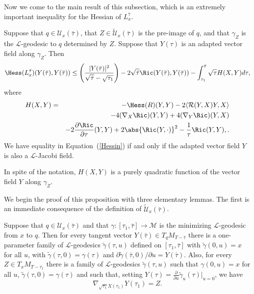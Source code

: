 Now we come to the main result of this subsection, which is an
extremely important inequality for the Hessian of $L_x^{\bar\tau}$.

\begin{proposition}\label{prop:l-length-hessian-inequality}
\label{Hessineq}
Suppose that $q\in {\mathcal U}_x(\bar\tau)$, that $Z\in
\widetilde{\mathcal U}_x(\bar\tau)$ is the pre-image of $q$,  and
that $\gamma_Z$ is the  ${\mathcal L}$-geodesic to $q$ determined by
$Z$. Suppose  that $Y(\tau)$ is an adapted vector field along
$\gamma_Z$. Then
\begin{equation}\label{Hessin}
\Hess(L_x^{\bar\tau})(Y(\bar\tau),Y(\bar\tau)) \leq
\left(\frac{|Y(\bar\tau)|^2}{\sqrt{\bar\tau}-\sqrt{\tau_1}}\right)-
2\sqrt{\bar\tau}\Ric(Y(\bar\tau),Y(\bar\tau)) -
\int_{\tau_1}^{\bar\tau}\sqrt{\tau}H(X,Y)d\tau,
\end{equation} where
\begin{eqnarray} \nonumber
H(X,Y) & =&-\Hess(R)(Y,Y) - 2\langle  {\mathcal R}(Y,X)Y,X\rangle
\\& &-4(\nabla_{X}\Ric)(Y,Y) +4(\nabla_{Y}\Ric)(Y,X)\label{Heqn}
\\& & - 2\frac{\partial\Ric}{\partial\tau}(Y,Y) + 2\abs{\Ric(Y,\cdot)}^{2} -
\frac{1}{\tau}\Ric(Y,Y),\nonumber.
\end{eqnarray}
 We
have equality in Equation~(\ref{Hessin}) if and only if the adapted vector
field $Y$ is also a ${\mathcal L}$-Jacobi field.
\end{proposition}

\begin{remark}[$H(X,Y)$ is quadratic in $Y$]\label{rem:h-quadratic-in-y}
In spite of the notation, $H(X,Y)$ is a purely quadratic function of
the vector field $Y$ along $\gamma_Z$.
\end{remark}

We begin the proof of this proposition with three elementary lemmas. The first
is an immediate consequence of the definition of $\widetilde {\mathcal
U}_x(\bar\tau)$.


\begin{lemma}\label{lem:l-geodesic-family-existence}
Suppose that $q\in {\mathcal U}_x(\bar\tau)$  and that $\gamma\colon
[\tau_1,\bar\tau]\to{\mathcal M}$ is the minimizing ${\mathcal
L}$-geodesic from $x$ to $q$. Then for every tangent vector $
Y(\bar\tau)\in T_qM_{T-\bar\tau}$ there is a one-parameter family of
${\mathcal L}$-geodesics   $\tilde\gamma(\tau,u)$ defined on
$[\tau_1,\bar\tau]$ with $\tilde\gamma(0,u)=x$ for all $u$, with
$\tilde\gamma(\tau,0)=\gamma(\tau)$ and $\partial\tilde
\gamma(\bar\tau,0)/\partial u=Y(\bar \tau)$. Also, for every $Z\in
T_xM_{T-\tau_1}$ there is a family of ${\mathcal L}$-geodesics
$\tilde\gamma(\tau,u)$ such that $\gamma(0,u)=x$ for all $u$,
$\tilde\gamma(\tau,0)=\gamma(\tau)$ and such that, setting
$Y(\tau)=\frac{\partial}{\partial u} \tilde\gamma_u(\tau)|_{u=0}$,
we have
$$\nabla_{\sqrt{\tau_1}X(\tau_1)}Y(\tau_1)=Z.$$
\end{lemma}


